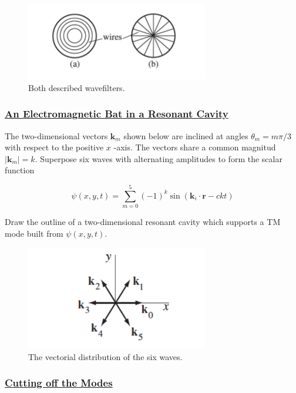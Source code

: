 \begin{figure}[h]
	\includegraphics[width=8cm]{figures/2waveguides.png}
	\centering
	\caption{Both described wavefilters.}
\end{figure}

\subsubsection{\hyperref[An Electromagnetic Bat in a Resonant Cavity]{An Electromagnetic Bat in a Resonant Cavity}}

The two-dimensional vectors $\mathbf{k}_{m}$ shown below are inclined at angles $\theta_{m}=m \pi / 3$ with respect to the positive $x$ -axis. The vectors share a common magnitud $\left|\mathbf{k}_{m}\right|=k$.
Superpose six waves with alternating amplitudes to form the scalar function

\begin{equation}
	\psi(x, y, t)=\sum_{m=0}^{5}(-1)^{k} \sin \left(\mathbf{k}_{i} \cdot \mathbf{r}-c k t\right)
\end{equation}

Draw the outline of a two-dimensional resonant cavity which supports a TM mode built from $\psi(x, y, t)$.

\begin{figure}[h]
	\includegraphics[width=8cm]{figures/6waves.png}
	\centering
	\caption{The vectorial distribution of the six waves.}
\end{figure}

\subsubsection{\hyperref[Cutting off the modes]{Cutting off the Modes}}

